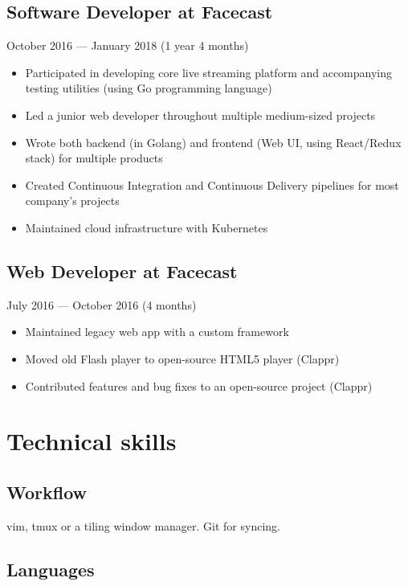 \documentclass[a4paper,11pt]{article}
\begin{document}
\subsection{Software Developer at Facecast}
October 2016 --- January 2018 (1 year 4 months)
\begin{itemize}[noitemsep]
    \renewcommand{\labelitemi}{---}

    \item Participated in developing core live streaming platform and accompanying testing utilities (using Go programming language)
    \item Led a junior web developer throughout multiple medium-sized projects
    \item Wrote both backend (in Golang) and frontend (Web UI, using React/Redux stack) for multiple products
    \item Created Continuous Integration and Continuous Delivery pipelines for most company's projects
    \item Maintained cloud infrastructure with Kubernetes
\end{itemize}

\subsection{Web Developer at Facecast}
July 2016 --- October 2016 (4 months)
\begin{itemize}[noitemsep]
    \renewcommand{\labelitemi}{---}

    \item Maintained legacy web app with a custom framework
    \item Moved old Flash player to open-source HTML5 player (Clappr)
    \item Contributed features and bug fixes to an open-source project (Clappr)
\end{itemize}

\section{Technical skills}

\subsection{Workflow}
vim, tmux or a tiling window manager. Git for syncing.

\subsection{Languages}
\end{document}
